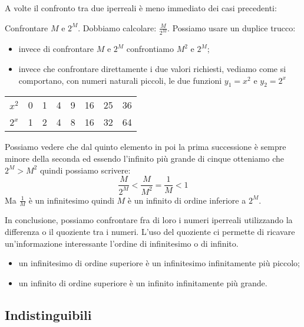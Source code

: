\vspace{1em}
A volte il confronto tra due iperreali è meno immediato dei casi precedenti:
\begin{esempio}
 Confrontare \(M\) e \(2^M\). 
 Dobbiamo calcolare: \(\frac{M}{2^M}\). 
Possiamo usare un duplice trucco: 
\begin{itemize} [nosep]
 \item invece di confrontare \(M\) e \(2^M\) confrontiamo \(M^2\) e \(2^M\);
 \item invece che confrontare direttamente i due valori richiesti, vediamo 
come si comportano, con numeri naturali piccoli, le due funzioni 
\(y_1=x^2\) e \(y_2=2^x\)
\end{itemize}
\begin{center}
\begin{tabular}{cccccccc}
\(x^2\) & 0 & 1 & 4 & 9 & 16 & 25 & 36\\
\(2^x\) & 1 & 2 & 4 & 8 & 16 & 32 & 64
\end{tabular}
\end{center}
Possiamo vedere che dal quinto elemento in poi la prima successione è sempre
minore della seconda ed essendo l'infinito più grande di cinque 
otteniamo che \(2^M > M^2\) quindi possiamo scrivere:
\[\frac{M}{2^M} < \frac{M}{M^2} = \frac{1}{M} < 1\]
Ma \(\frac{1}{M}\) è un infinitesimo quindi \(M\) è un infinito di ordine 
inferiore a \(2^M\).
\end{esempio}

In conclusione, possiamo confrontare fra di loro i numeri iperreali 
utilizzando la differenza o il quoziente tra i numeri. L'uso del quoziente 
ci permette di ricavare un'informazione interessante l'ordine di 
infinitesimo o di infinito.
\begin{itemize} [noitemsep]
 \item un infinitesimo di ordine superiore è un infinitesimo infinitamente 
 più piccolo;
 \item un infinito di ordine superiore è un infinito infinitamente più 
grande.
\end{itemize}

\subsection{Indistinguibili}
\label{subsec:insnum_indistinguibili}

